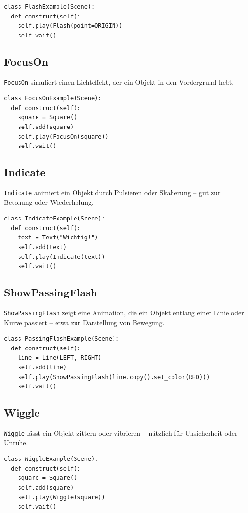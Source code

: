 \documentclass[12pt]{article}
\begin{document}
\begin{verbatim}
class FlashExample(Scene):
  def construct(self):
    self.play(Flash(point=ORIGIN))
    self.wait()
\end{verbatim}

\subsection{FocusOn}
\texttt{FocusOn} simuliert einen Lichteffekt, der ein Objekt in den Vordergrund hebt.

\begin{verbatim}
class FocusOnExample(Scene):
  def construct(self):
    square = Square()
    self.add(square)
    self.play(FocusOn(square))
    self.wait()
\end{verbatim}

\subsection{Indicate}
\texttt{Indicate} animiert ein Objekt durch Pulsieren oder Skalierung – gut zur Betonung oder Wiederholung.

\begin{verbatim}
class IndicateExample(Scene):
  def construct(self):
    text = Text("Wichtig!")
    self.add(text)
    self.play(Indicate(text))
    self.wait()
\end{verbatim}

\subsection{ShowPassingFlash}
\texttt{ShowPassingFlash} zeigt eine Animation, die ein Objekt entlang einer Linie oder Kurve passiert – etwa zur Darstellung von Bewegung.

\begin{verbatim}
class PassingFlashExample(Scene):
  def construct(self):
    line = Line(LEFT, RIGHT)
    self.add(line)
    self.play(ShowPassingFlash(line.copy().set_color(RED)))
    self.wait()
\end{verbatim}

\subsection{Wiggle}
\texttt{Wiggle} lässt ein Objekt zittern oder vibrieren – nützlich für Unsicherheit oder Unruhe.

\begin{verbatim}
class WiggleExample(Scene):
  def construct(self):
    square = Square()
    self.add(square)
    self.play(Wiggle(square))
    self.wait()
\end{verbatim}
\end{document}
